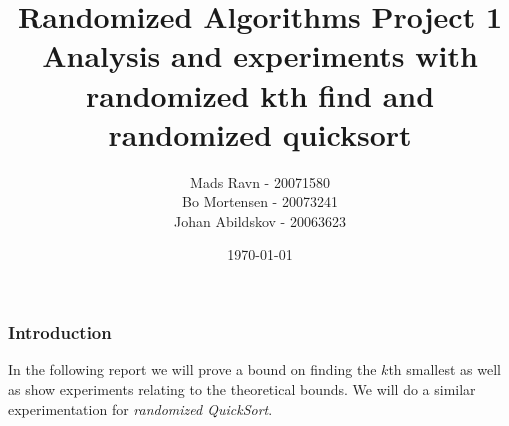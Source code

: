 \documentclass[article,a4paper,oneside]{article}
\newcommand{\+}[1]{\ensuremath{\boldsymbol{#1}}}
\begin{document}
\title{
Randomized Algorithms Project 1\\
Analysis and experiments with randomized kth find and randomized quicksort
}

\author{
  Mads Ravn - 20071580\\
  Bo Mortensen - 20073241\\
  Johan Abildskov - 20063623
}

\date{\today}

\maketitle

\newpage


\subsubsection*{Introduction}
In the following report we will prove a bound on finding the $k$th smallest as well as show experiments relating to the theoretical bounds. We will do a similar experimentation for \emph{randomized QuickSort}.
\end{document}
